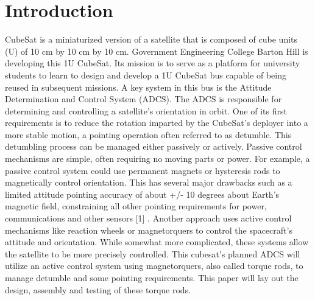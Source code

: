 \chapter{Introduction}
 CubeSat is a miniaturized version of a satellite that is composed of cube units (U) of 10 cm by 10 cm by
10 cm. Government Engineering College Barton Hill is developing this 1U CubeSat. Its mission is to serve as
a platform for university students to learn to design and develop a 1U CubeSat bus capable of being reused in
subsequent missions. A key system in this bus is the Attitude Determination and Control System (ADCS). The
ADCS is responsible for determining and controlling a satellite’s orientation in orbit. One of its first requirements is
to reduce the rotation imparted by the CubeSat’s deployer into a more stable motion, a pointing operation often
referred to as detumble. This detumbling process can be managed either passively or actively. Passive control
mechanisms are simple, often requiring no moving parts or power. For example, a passive control system could use
permanent magnets or hysteresis rods to magnetically control orientation. This has several major drawbacks such as
a limited attitude pointing accuracy of about +/- 10 degrees about Earth’s magnetic field, constraining all other
pointing requirements for power, communications and other sensors [1] . Another approach uses active control
mechanisms like reaction wheels or magnetorquers to control the spacecraft’s attitude and orientation. While
somewhat more complicated, these systems allow the satellite to be more precisely controlled. This cubesat's planned
ADCS will utilize an active control system using magnetorquers, also called torque rods, to manage detumble and
some pointing requirements. This paper will lay out the design, assembly and testing of these torque rods.
